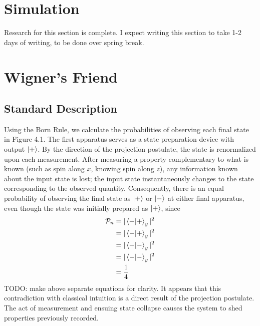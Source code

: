 \chapter{Simulation}
Research for this section is complete. I expect writing this section to take 1-2 days of writing, to be done over spring break.
\chapter{Wigner's Friend}

\section{Standard Description}
Using the Born Rule, we calculate the probabilities of observing each final state in Figure 4.1. The first apparatus serves as a state preparation device with output $\ket{+}$. By the direction of the projection postulate, the state is renormalized upon each measurement. After measuring a property complementary to what is known (such as spin along $x$, knowing spin along $z$), any information known about the input state is lost; the input state instantaneously changes to the state corresponding to the observed quantity. Consequently, there is an equal probability of observing the final state as $\ket{+}$ or $\ket{-}$ at either final apparatus, even though the state was initially prepared as $\ket{+}$, since
\begin{align}
    \mathcal{P}_n &= |\braket{+|+}_y|^2 \\
                  &= |\braket{-|+}_y|^2 \\
                  &= |\braket{+|-}_y|^2 \\
                  &= |\braket{-|-}_y|^2 \\
                  &= \frac{1}{4}
\end{align}
TODO: make above separate equations for clarity.
It appears that this contradiction with classical intuition is a direct result of the projection postulate. The act of measurement and ensuing state collapse causes the system to shed properties previously recorded.

